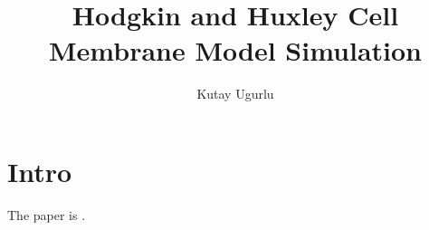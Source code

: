 \documentclass[]{IEEEtran}
\title{Hodgkin and Huxley Cell Membrane Model Simulation}
\author{Kutay Ugurlu}
\begin{document}
\maketitle
\clearpage

\section{Intro}
The paper is \cite{hodgkin1952quantitative}.
\clearpage
\printbibliography
\end{document}
